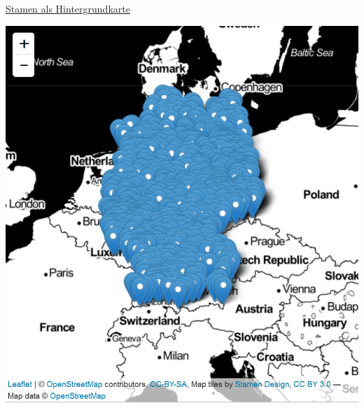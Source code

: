 \documentclass[ignorenonframetext,]{beamer}
\newenvironment{Shaded}{\begin{snugshade}}{\end{snugshade}}
\newcommand{\KeywordTok}[1]{\textcolor[rgb]{0.13,0.29,0.53}{\textbf{#1}}}
\newcommand{\NormalTok}[1]{#1}
\newcommand{\OperatorTok}[1]{\textcolor[rgb]{0.81,0.36,0.00}{\textbf{#1}}}
\newcommand{\StringTok}[1]{\textcolor[rgb]{0.31,0.60,0.02}{#1}}
\begin{document}
\begin{frame}[fragile]{\href{https://rstudio.github.io/leaflet/basemaps.html}{Stamen
als Hintergrundkarte}}
\protect\hypertarget{stamen-als-hintergrundkarte}{}

\begin{Shaded}
\end{Shaded}

\includegraphics{figure/InteractiveStamen.PNG}

\end{frame}
\end{document}
